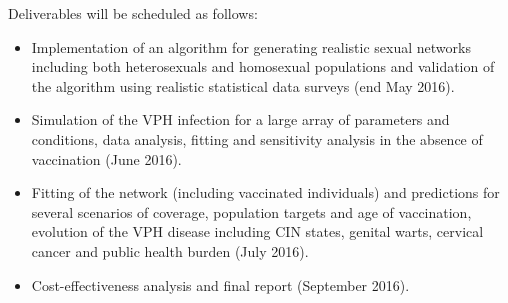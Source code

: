 Deliverables will be scheduled as follows:
\begin{itemize}
	\item Implementation of an algorithm for generating realistic sexual networks including both heterosexuals and homosexual populations and validation of the algorithm using realistic statistical data surveys (end May 2016). 
	\item Simulation of the VPH infection for a large array of parameters and conditions, data analysis, fitting and sensitivity analysis in the absence of vaccination (June 2016).
	\item Fitting of the network (including vaccinated individuals) and predictions for several scenarios of coverage, population targets and age of vaccination, evolution of the VPH disease including CIN states, genital warts, cervical cancer and public health burden (July 2016).
	\item Cost-effectiveness analysis and final report (September 2016).
\end{itemize}

 
